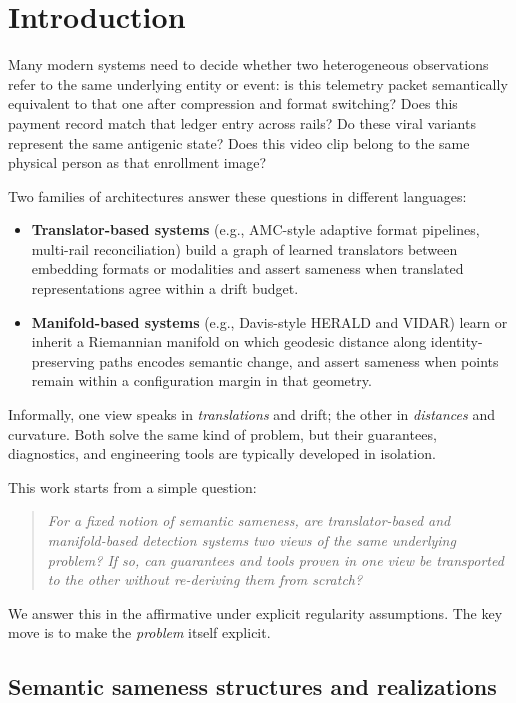 \documentclass[11pt]{article}
\begin{document}
\section{Introduction}

Many modern systems need to decide whether two heterogeneous observations refer to the same
underlying entity or event: is this telemetry packet semantically equivalent to that one after
compression and format switching?  Does this payment record match that ledger entry across rails?
Do these viral variants represent the same antigenic state?  Does this video clip belong to the
same physical person as that enrollment image?

Two families of architectures answer these questions in different languages:

\begin{itemize}
  \item \textbf{Translator-based systems} (e.g., AMC-style adaptive format pipelines, multi-rail
  reconciliation) build a graph of learned translators between embedding formats or modalities and
  assert sameness when translated representations agree within a drift budget.
  \item \textbf{Manifold-based systems} (e.g., Davis-style HERALD and VIDAR) learn or inherit a
  Riemannian manifold on which geodesic distance along identity-preserving paths encodes semantic
  change, and assert sameness when points remain within a configuration margin in that geometry.
\end{itemize}

Informally, one view speaks in \emph{translations} and drift; the other in \emph{distances} and
curvature.  Both solve the same kind of problem, but their guarantees, diagnostics, and engineering
tools are typically developed in isolation.

This work starts from a simple question:

\begin{quote}
\emph{For a fixed notion of semantic sameness, are translator-based and manifold-based detection
systems two views of the same underlying problem?  If so, can guarantees and tools proven in one
view be transported to the other without re-deriving them from scratch?}
\end{quote}

We answer this in the affirmative under explicit regularity assumptions.  The key move is to make
the \emph{problem} itself explicit.

\subsection{Semantic sameness structures and realizations}\label{sec:sameness}
\end{document}
